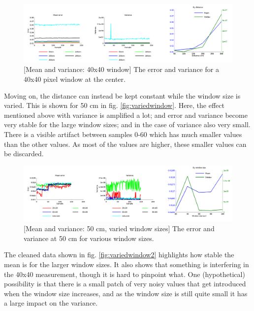 \documentclass[11pt]{article}
\begin{document}
\begin{figure}[ht]
  \includegraphics[width=1\textwidth]{figures/plot40x40.png}
  [Mean and variance: 40x40 window]{\label{fig:40x40} The
    error and variance for a 40x40 pixel window at the center.}
\end{figure}

Moving on, the distance can instead be kept constant while the window size is
varied. This is shown for 50 cm in fig.  \vref{fig:variedwindow}. Here, the
effect mentioned above with variance is amplified a lot; and error and variance
become very stable for the large window sizes; and in the case of variance also
very small. There is a visible artifact between samples 0-60 which
has much smaller values than the other values. As most of the values are higher, these
smaller values can be discarded. \par


\begin{figure}[ht]
  \centering
  \includegraphics[width=1\textwidth]{figures/plotwindowsizes.png}
  [Mean and variance: 50 cm, varied window
  sizes]{\label{fig:variedwindow} The error and variance at 50 cm for various
    window sizes.}
\end{figure}

The cleaned data shown in fig. \vref{fig:variedwindow2} highlights how stable
the mean is for the larger window sizes. It also shows that something is
interfering in the 40x40 measurement, though it is hard to pinpoint what. One
(hypothetical) possibility is that there is a small patch of very noisy values
that get introduced when the window size increases, and as the window size is
still quite small it has a large impact on the variance. \par
\end{document}
